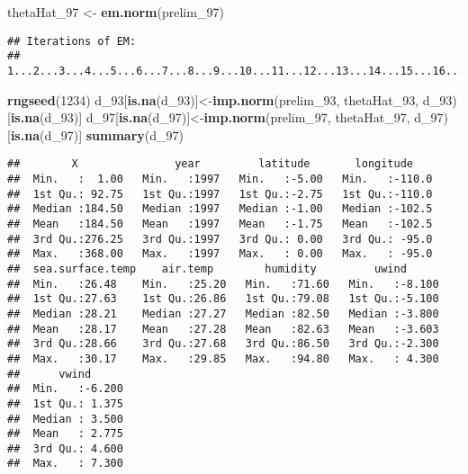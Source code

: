 \documentclass[]{article}
\newenvironment{Shaded}{\begin{snugshade}}{\end{snugshade}}
\newcommand{\KeywordTok}[1]{\textcolor[rgb]{0.13,0.29,0.53}{\textbf{#1}}}
\newcommand{\DecValTok}[1]{\textcolor[rgb]{0.00,0.00,0.81}{#1}}
\newcommand{\StringTok}[1]{\textcolor[rgb]{0.31,0.60,0.02}{#1}}
\newcommand{\NormalTok}[1]{#1}
\begin{document}
\begin{Shaded}
\begin{Highlighting}[]
\NormalTok{thetaHat_}\DecValTok{97}\NormalTok{ <-}\StringTok{ }\KeywordTok{em.norm}\NormalTok{(prelim_}\DecValTok{97}\NormalTok{)}
\end{Highlighting}
\end{Shaded}

\begin{verbatim}
## Iterations of EM: 
## 1...2...3...4...5...6...7...8...9...10...11...12...13...14...15...16...17...18...19...20...21...22...23...24...25...26...27...28...29...30...31...32...33...34...35...36...37...38...39...40...41...42...43...44...45...46...47...48...49...50...51...52...53...54...55...56...57...58...59...60...61...62...63...64...65...66...
\end{verbatim}

\begin{Shaded}
\begin{Highlighting}[]
\KeywordTok{rngseed}\NormalTok{(}\DecValTok{1234}\NormalTok{)}
\NormalTok{d_}\DecValTok{93}\NormalTok{[}\KeywordTok{is.na}\NormalTok{(d_}\DecValTok{93}\NormalTok{)]<-}\KeywordTok{imp.norm}\NormalTok{(prelim_}\DecValTok{93}\NormalTok{, thetaHat_}\DecValTok{93}\NormalTok{, d_}\DecValTok{93}\NormalTok{)[}\KeywordTok{is.na}\NormalTok{(d_}\DecValTok{93}\NormalTok{)]}
\NormalTok{d_}\DecValTok{97}\NormalTok{[}\KeywordTok{is.na}\NormalTok{(d_}\DecValTok{97}\NormalTok{)]<-}\KeywordTok{imp.norm}\NormalTok{(prelim_}\DecValTok{97}\NormalTok{, thetaHat_}\DecValTok{97}\NormalTok{, d_}\DecValTok{97}\NormalTok{)[}\KeywordTok{is.na}\NormalTok{(d_}\DecValTok{97}\NormalTok{)]}
\KeywordTok{summary}\NormalTok{(d_}\DecValTok{97}\NormalTok{)}
\end{Highlighting}
\end{Shaded}

\begin{verbatim}
##        X               year         latitude       longitude     
##  Min.   :  1.00   Min.   :1997   Min.   :-5.00   Min.   :-110.0  
##  1st Qu.: 92.75   1st Qu.:1997   1st Qu.:-2.75   1st Qu.:-110.0  
##  Median :184.50   Median :1997   Median :-1.00   Median :-102.5  
##  Mean   :184.50   Mean   :1997   Mean   :-1.75   Mean   :-102.5  
##  3rd Qu.:276.25   3rd Qu.:1997   3rd Qu.: 0.00   3rd Qu.: -95.0  
##  Max.   :368.00   Max.   :1997   Max.   : 0.00   Max.   : -95.0  
##  sea.surface.temp    air.temp        humidity         uwind       
##  Min.   :26.48    Min.   :25.20   Min.   :71.60   Min.   :-8.100  
##  1st Qu.:27.63    1st Qu.:26.86   1st Qu.:79.08   1st Qu.:-5.100  
##  Median :28.21    Median :27.27   Median :82.50   Median :-3.800  
##  Mean   :28.17    Mean   :27.28   Mean   :82.63   Mean   :-3.603  
##  3rd Qu.:28.66    3rd Qu.:27.68   3rd Qu.:86.50   3rd Qu.:-2.300  
##  Max.   :30.17    Max.   :29.85   Max.   :94.80   Max.   : 4.300  
##      vwind       
##  Min.   :-6.200  
##  1st Qu.: 1.375  
##  Median : 3.500  
##  Mean   : 2.775  
##  3rd Qu.: 4.600  
##  Max.   : 7.300
\end{verbatim}
\end{document}
